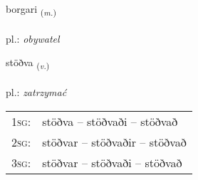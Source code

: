 \documentclass[frontgrid, backgrid]{flacards}\usepackage[]{graphicx}\usepackage[]{xcolor}
\begin{document}
\renewcommand{\blhead}{\vskip5pt {\small\bfseries\footnotesize Nafnorð | Noun }}
\renewcommand{\bcfoot}{\vskip5pt \hspace{2pt}{\small\bfseries\footnotesize 2K}}


{borgari \small{\textsubscript{(\textit{m.})}} \\[1ex] %
\textphonetic{[pɔrkarɪ]} \\
pl.: \emph{obywatel} \\  [2ex]
\renewcommand*{\arraystretch}{0.8}
}

\renewcommand{\flhead}{\vskip5pt \fboxsep=0pt {\small\bfseries\footnotesize Sagnorð | Verb}}
\renewcommand{\fcfoot}{\vskip5pt \fboxsep=0pt \hspace{2pt}{\small\bfseries\footnotesize 2K}}

\renewcommand{\blhead}{\vskip5pt {\small\bfseries\footnotesize Sagnorð | Verb }}
\renewcommand{\bcfoot}{\vskip5pt \hspace{2pt}{\small\bfseries\footnotesize 2K}}


{stöðva \small{\textsubscript{(\textit{v.})}} \\[1ex] %
\textphonetic{[stœðva]} \\
pl.: \emph{zatrzymać} \\  [2ex]
\renewcommand*{\arraystretch}{0.8}
\begin{tabular}{p{1cm}l}
\textsc{1sg}: & stöðva -- stöðvaði -- stöðvað \\ 
\textsc{2sg}: & stöðvar -- stöðvaðir -- stöðvað \\ 
\textsc{3sg}: & stöðvar -- stöðvaði -- stöðvað \\ 
\end{tabular}
}
\end{document}
